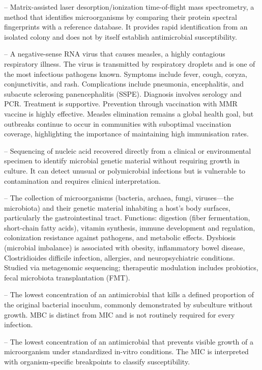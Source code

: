 -- Matrix-assisted laser desorption/ionization time-of-flight mass spectrometry, a method that identifies microorganisms by comparing their protein spectral fingerprints with a reference database. It provides rapid identification from an isolated colony and does not by itself establish antimicrobial susceptibility.

-- A negative-sense RNA virus that causes measles, a highly contagious respiratory illness. The virus is transmitted by respiratory droplets and is one of the most infectious pathogens known. Symptoms include fever, cough, coryza, conjunctivitis, and rash. Complications include pneumonia, encephalitis, and subacute sclerosing panencephalitis (SSPE). Diagnosis involves serology and PCR. Treatment is supportive. Prevention through vaccination with MMR vaccine is highly effective. Measles elimination remains a global health goal, but outbreaks continue to occur in communities with suboptimal vaccination coverage, highlighting the importance of maintaining high immunisation rates.

-- Sequencing of nucleic acid recovered directly from a clinical or environmental specimen to identify microbial genetic material without requiring growth in culture. It can detect unusual or polymicrobial infections but is vulnerable to contamination and requires clinical interpretation.

-- The collection of microorganisms (bacteria, archaea, fungi, viruses—the microbiota) and their genetic material inhabiting a host's body surfaces, particularly the gastrointestinal tract. Functions: digestion (fiber fermentation, short-chain fatty acids), vitamin synthesis, immune development and regulation, colonization resistance against pathogens, and metabolic effects. Dysbiosis (microbial imbalance) is associated with obesity, inflammatory bowel disease, Clostridioides difficile infection, allergies, and neuropsychiatric conditions. Studied via metagenomic sequencing; therapeutic modulation includes probiotics, fecal microbiota transplantation (FMT).

-- The lowest concentration of an antimicrobial that kills a defined proportion of the original bacterial inoculum, commonly demonstrated by subculture without growth. MBC is distinct from MIC and is not routinely required for every infection.

-- The lowest concentration of an antimicrobial that prevents visible growth of a microorganism under standardized in-vitro conditions. The MIC is interpreted with organism-specific breakpoints to classify susceptibility.

